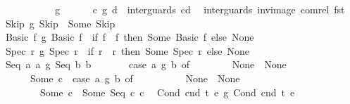 \begin{isabellebody}
\ \ \ \ \ \ \ \ \ \ \ {\isacharparenleft}{\isachardoublequoteopen}{\isacharunderscore}\ {\isasyminter}\isactrlsub g\ {\isacharunderscore}{\isachardoublequoteclose}\ {\isacharbrackleft}{}{}{\isacharcomma}{}{}{\isacharbrackright}\ {}{}{\isacharparenright}\isanewline
\ \ \ {\isachardoublequoteopen}c\ {\isasyminter}\isactrlsub g\ d\ {\isacharequal}{\isacharequal}\ inter{\isacharunderscore}guards\ {\isacharparenleft}c{\isacharcomma}d{\isacharparenright}{\isachardoublequoteclose}\ \isanewline
\isanewline
{}\isamarkupfalse%
\ inter{\isacharunderscore}guards\ {\isachardoublequoteopen}inv{\isacharunderscore}image\ com{\isacharunderscore}rel\ fst{\isachardoublequoteclose}\ \isanewline
\ \ {\isachardoublequoteopen}{\isacharparenleft}Skip\ {\isasyminter}\isactrlsub g\ Skip{\isacharparenright}\ {\isacharequal}\ Some\ Skip{\isachardoublequoteclose}\isanewline
\ \ {\isachardoublequoteopen}{\isacharparenleft}Basic\ f{}\ {\isasyminter}\isactrlsub g\ Basic\ f{}{\isacharparenright}\ {\isacharequal}\ {\isacharparenleft}if\ f{}\ {\isacharequal}\ f{}\ then\ Some\ {\isacharparenleft}Basic\ f{}{\isacharparenright}\ else\ None{\isacharparenright}{\isachardoublequoteclose}\isanewline
\ \ {\isachardoublequoteopen}{\isacharparenleft}Spec\ r{}\ {\isasyminter}\isactrlsub g\ Spec\ r{}{\isacharparenright}\ {\isacharequal}\ {\isacharparenleft}if\ r{}\ {\isacharequal}\ r{}\ then\ Some\ {\isacharparenleft}Spec\ r{}{\isacharparenright}\ else\ None{\isacharparenright}{\isachardoublequoteclose}\isanewline
\ \ {\isachardoublequoteopen}{\isacharparenleft}Seq\ a{}\ a{}\ {\isasyminter}\isactrlsub g\ Seq\ b{}\ b{}{\isacharparenright}\ {\isacharequal}\ \isanewline
\ \ \ \ \ {\isacharparenleft}case\ a{}\ {\isasyminter}\isactrlsub g\ b{}\ of\isanewline
\ \ \ \ \ \ \ \ None\ {\isasymRightarrow}\ None\isanewline
\ \ \ \ \ \ {\isacharbar}\ Some\ c{}\ {\isasymRightarrow}\ {\isacharparenleft}case\ a{}\ {\isasyminter}\isactrlsub g\ b{}\ of\isanewline
\ \ \ \ \ \ \ \ \ \ None\ {\isasymRightarrow}\ None\isanewline
\ \ \ \ \ \ \ \ {\isacharbar}\ Some\ c{}\ {\isasymRightarrow}\ Some\ {\isacharparenleft}Seq\ c{}\ c{}{\isacharparenright}{\isacharparenright}{\isacharparenright}{\isachardoublequoteclose}\isanewline
\ \ {\isachardoublequoteopen}{\isacharparenleft}Cond\ cnd{}\ t{}\ e{}\ {\isasyminter}\isactrlsub g\ Cond\ cnd{}\ t{}\ e{}{\isacharparenright}\ {\isacharequal}\ \isanewline

\end{isabellebody}
